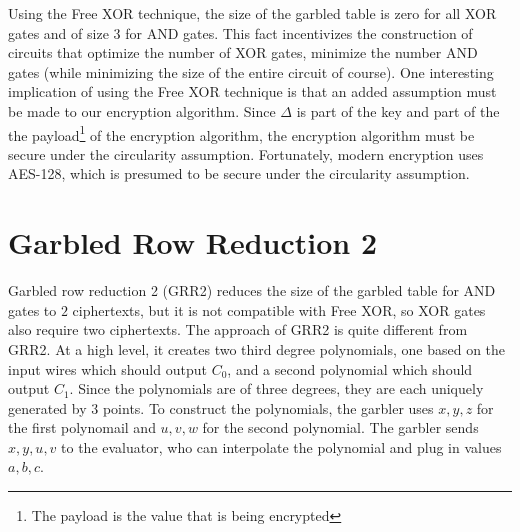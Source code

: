 Using the Free XOR technique, the size of the garbled table is zero for all XOR gates and of size $3$ for AND gates.
This fact incentivizes the construction of circuits that optimize the number of XOR gates, minimize the number AND gates (while minimizing the size of the entire circuit of course).
One interesting implication of using the Free XOR technique is that an added assumption must be made to our encryption algorithm.
Since $\Delta$ is part of the key and part of the the payload\footnote{The payload is the value that is being encrypted} of the encryption algorithm, the encryption algorithm must be secure under the circularity assumption.
Fortunately, modern encryption uses AES-128, which is presumed to be secure under the circularity assumption.


\section{Garbled Row Reduction 2}
Garbled row reduction 2 (GRR2) reduces the size of the garbled table for AND gates to $2$ ciphertexts, but it is not compatible with Free XOR, so XOR gates also require two ciphertexts.
The approach of GRR2 is quite different from GRR2. 
At a high level, it creates two third degree polynomials, one based on the input wires which should output $C_0$, and a second polynomial which should output $C_1$.
Since the polynomials are of three degrees, they are each uniquely generated by $3$ points. 
To construct the polynomials, the garbler uses $x,y,z$ for the first polynomail and $u,v,w$ for the second polynomial.
The garbler sends $x,y,u,v$ to the evaluator, who can interpolate the polynomial and plug in values $a,b,c$.

